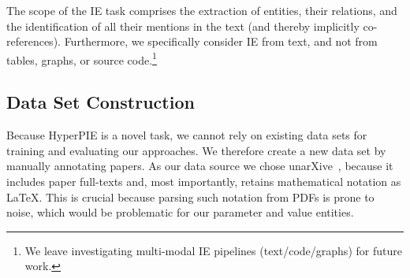 


The scope of the IE task comprises the extraction of entities, their relations, and the identification of all their mentions in the text (and thereby implicitly co-references). %
Furthermore, we specifically consider IE from text, and not from tables, graphs, or source code.\footnote{We leave investigating multi-modal IE pipelines (text/code/graphs) for future work.}

\subsection{Data Set Construction}\label{sec:data-set-contruction}





Because HyperPIE is a novel task, we cannot rely on existing data sets for training and evaluating our approaches. We therefore create a new data set by manually annotating papers. As our data source we chose unarXive~\cite{Saier2023unarXive}, because it includes paper full-texts and, most importantly, retains mathematical notation as \LaTeX. This is crucial because parsing such notation from PDFs is prone to noise, which would be problematic for our parameter and value entities.  %

